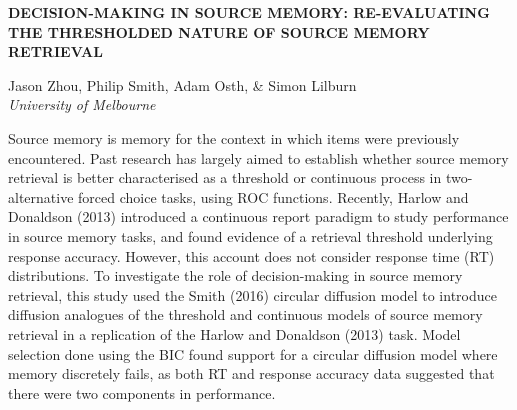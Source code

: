 \documentclass[]{article}
\begin{document}
\textbf{DECISION-MAKING IN SOURCE MEMORY: RE-EVALUATING THE THRESHOLDED
NATURE OF SOURCE MEMORY RETRIEVAL}

Jason Zhou, Philip Smith, Adam Osth, \& Simon Lilburn\\
\emph{University of Melbourne}

Source memory is memory for the context in which items were previously
encountered. Past research has largely aimed to establish whether source
memory retrieval is better characterised as a threshold or continuous
process in two-alternative forced choice tasks, using ROC functions.
Recently, Harlow and Donaldson (2013) introduced a continuous report
paradigm to study performance in source memory tasks, and found evidence
of a retrieval threshold underlying response accuracy. However, this
account does not consider response time (RT) distributions. To
investigate the role of decision-making in source memory retrieval, this
study used the Smith (2016) circular diffusion model to introduce
diffusion analogues of the threshold and continuous models of source
memory retrieval in a replication of the Harlow and Donaldson (2013)
task. Model selection done using the BIC found support for a circular
diffusion model where memory discretely fails, as both RT and response
accuracy data suggested that there were two components in performance.\\
\pagebreak
\end{document}
